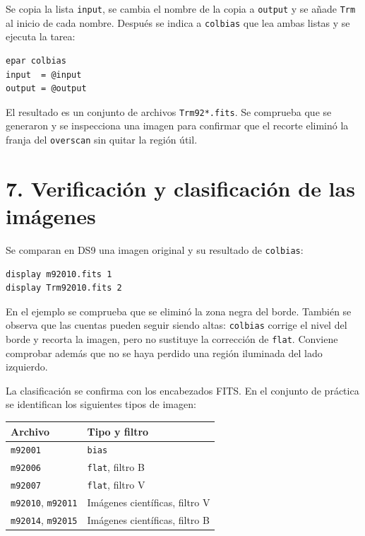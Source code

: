 \documentclass[11pt]{article}
\begin{document}
Se copia la lista \texttt{input}, se cambia el nombre de la copia a
\texttt{output} y se añade \texttt{Trm} al inicio de cada nombre. Después se
indica a \texttt{colbias} que lea ambas listas y se ejecuta la tarea:

\begin{verbatim}
epar colbias
input  = @input
output = @output
\end{verbatim}

\begin{center}
  
\end{center}

El resultado es un conjunto de archivos \texttt{Trm92*.fits}. Se comprueba que
se generaron y se inspecciona una imagen para confirmar que el recorte eliminó
la franja del \texttt{overscan} sin quitar la región útil.

\newpage
\section*{7. Verificación y clasificación de las imágenes}

Se comparan en DS9 una imagen original y su resultado de \texttt{colbias}:

\begin{verbatim}
display m92010.fits 1
display Trm92010.fits 2
\end{verbatim}

En el ejemplo se comprueba que se eliminó la zona negra del borde. También se
observa que las cuentas pueden seguir siendo altas: \texttt{colbias} corrige
el nivel del borde y recorta la imagen, pero no sustituye la corrección de
\texttt{flat}. Conviene comprobar además que no se haya perdido una región
iluminada del lado izquierdo.

La clasificación se confirma con los encabezados FITS. En el conjunto de
práctica se identifican los siguientes tipos de imagen:

\begin{center}
\begin{tabular}{ll}
\hline
Archivo & Tipo y filtro\\
\hline
\texttt{m92001} & \texttt{bias}\\
\texttt{m92006} & \texttt{flat}, filtro B\\
\texttt{m92007} & \texttt{flat}, filtro V\\
\texttt{m92010}, \texttt{m92011} & Imágenes científicas, filtro V\\
\texttt{m92014}, \texttt{m92015} & Imágenes científicas, filtro B\\
\hline
\end{tabular}
\end{center}
\end{document}
